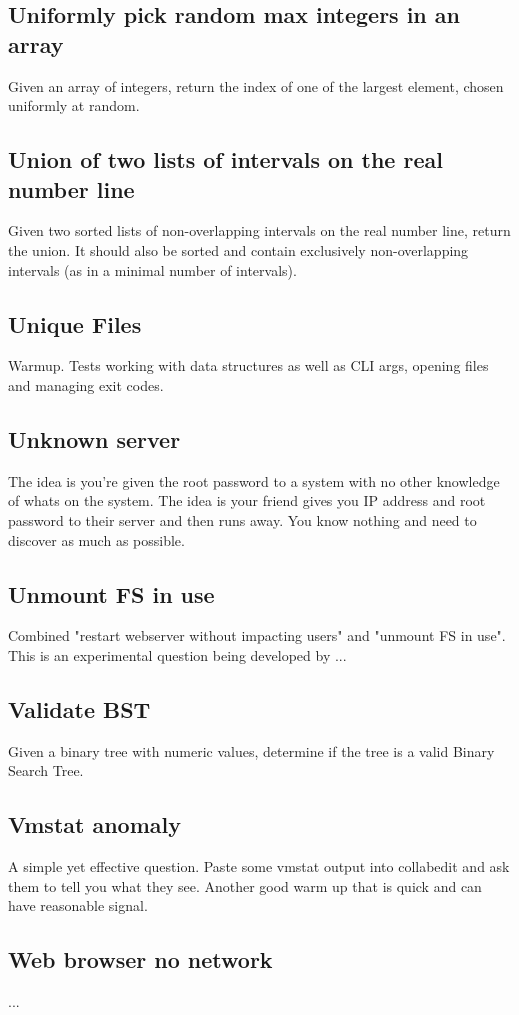 \documentclass{llncs}
\begin{document}
\subsection{Uniformly pick random max integers in an array}
Given an array of integers, return the index of one of the largest element, chosen uniformly at random.

\subsection{Union of two lists of intervals on the real number line}
Given two sorted lists of non-overlapping intervals on the real number line, return the union. It should also be sorted and contain exclusively non-overlapping intervals (as in a minimal number of intervals).

\subsection{Unique Files}
Warmup. Tests working with data structures as well as CLI args, opening files and managing exit codes.

\subsection{Unknown server}
The idea is you're given the root password to a system with no other knowledge of whats on the system. The idea is your friend gives you IP address and root password to their server and then runs away. You know nothing and need to discover as much as possible.

\subsection{Unmount FS in use}
Combined "restart webserver without impacting users" and "unmount FS in use". This is an experimental question being developed by ...

\subsection{Validate BST}
Given a binary tree with numeric values, determine if the tree is a valid Binary Search Tree.

\subsection{Vmstat anomaly}
A simple yet effective question. Paste some vmstat output into collabedit and ask them to tell you what they see. Another good warm up that is quick and can have reasonable signal.

\subsection{Web browser no network}
...
\end{document}
